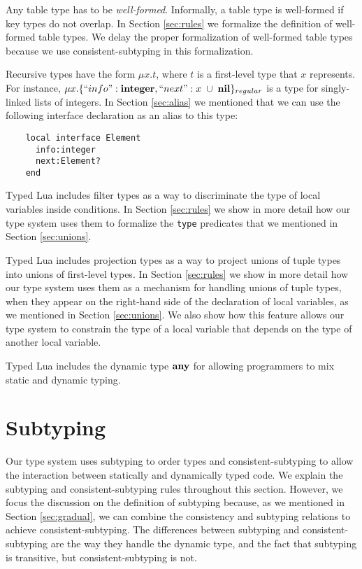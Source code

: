 Any table type has to be \emph{well-formed}.
Informally, a table type is well-formed if key types do not overlap.
In Section \ref{sec:rules} we formalize the definition of well-formed table types.
We delay the proper formalization of well-formed table types because we use
consistent-subtyping in this formalization.

Recursive types have the form $\mu x.t$,
where $t$ is a first-level type that $x$ represents.
For instance, $\mu x.\{``info":\mathbf{integer}, ``next":x \;\cup\; \mathbf{nil}\}_{regular}$
is a type for singly-linked lists of integers.
In Section \ref{sec:alias} we mentioned that we can use the following
interface declaration as an alias to this type:
\begin{verbatim}
    local interface Element
      info:integer
      next:Element?
    end
\end{verbatim}

Typed Lua includes filter types as a way to discriminate the type of local
variables inside conditions.
In Section \ref{sec:rules} we show in more detail how our type system
uses them to formalize the \texttt{type} predicates that we mentioned
in Section \ref{sec:unions}.

Typed Lua includes projection types as a way to project
unions of tuple types into unions of first-level types.
In Section \ref{sec:rules} we show in more detail how our type system
uses them as a mechanism for handling unions of tuple types,
when they appear on the right-hand side of the declaration of local variables,
as we mentioned in Section \ref{sec:unions}.
We also show how this feature allows our type system to constrain
the type of a local variable that depends on the type of another local variable.

Typed Lua includes the dynamic type $\mathbf{any}$ for allowing programmers
to mix static and dynamic typing.

\section{Subtyping}
\label{sec:subtyping}

Our type system uses subtyping \citep{cardelli1984smi,abadi1996to} to order
types and consistent-subtyping \citep{siek2007objects,siek2013mutable}
to allow the interaction between statically and dynamically typed code.
We explain the subtyping and consistent-subtyping rules throughout this section.
However, we focus the discussion on the definition of subtyping because,
as we mentioned in Section \ref{sec:gradual}, we can combine the
consistency and subtyping relations to achieve consistent-subtyping.
The differences between subtyping and consistent-subtyping are the way
they handle the dynamic type, and the fact that subtyping is transitive,
but consistent-subtyping is not.

